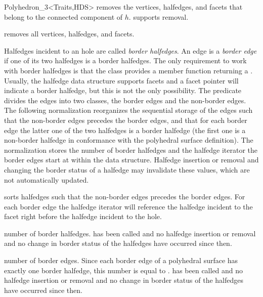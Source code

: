 \begin{ccClassTemplate}{Polyhedron_3<Traits,HDS>}
    {removes the  vertices, halfedges, and facets that belong to the 
     connected component of $h$. \ccPrecond {} supports removal.}

    {removes all vertices, halfedges, and facets.}



\begin{ccAdvanced}
  
Halfedges incident to an hole are called {\em border halfedges}. An
edge is a {\em border edge\/} if one of its two halfedges is a border
halfedges. The only requirement to work with border halfedges is
that the  class provides a member function
 returning a . Usually, the halfedge data
structure supports facets and a  facet pointer will
indicate a border halfedge, but this is not the only possibility.
The  predicate divides the edges into two classes,
the border edges and the non-border edges. The following
normalization reorganizes the sequential storage of the edges such
that the non-border edges precedes the border edges, and that for
each border edge the latter one of the two halfedges is a border
halfedge (the first one is a non-border halfedge in conformance with
the polyhedral surface definition). The normalization stores the
number of border halfedges and the halfedge iterator the border
edges start at within the data structure.  Halfedge insertion or
removal and changing the border status of a halfedge may invalidate
these values, which are not automatically updated.


    {sorts halfedges such that the non-border edges precedes the
     border edges. For each border edge the halfedge iterator will
    reference the halfedge incident to the facet right before the
    halfedge incident to the hole.} 

    {number of border halfedges.
    \ccPrecond {} has been called and no
    halfedge insertion or removal and no change in border
    status of the halfedges have occurred since then.}

    {number of border edges. Since each border edge of a polyhedral
    surface has exactly one border halfedge,
    this number is equal to .
    \ccPrecond {} has been called and no
    halfedge insertion or removal and no change in border
    status of the halfedges have occurred since then.}


\end{ccAdvanced}
\end{ccClassTemplate}
